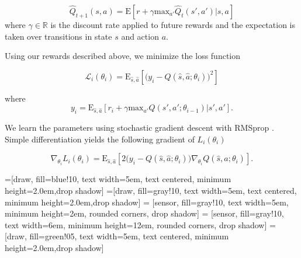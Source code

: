 \documentclass[12pt]{article}
\begin{document}
\begin{equation}
	\hat{Q}_{t+1}(s,a) = \textrm{E}[ r + \gamma \textrm{max}_{a'} \hat{Q}_t(s', a') | s, a]
\end{equation}
where $\gamma \in \mathbb{R}$ is the discount rate applied to future rewards and the expectation is taken over transitions in state $s$ and action $a$.

Using our rewards described above, we minimize the loss function

\begin{equation}
	\mathcal{L}_i(\theta_i) =  \textrm{E}_{\hat{s}, \hat{a}}[ \big (y_i - Q(\hat{s}, \hat{a}; \theta_i) \big )^2]
\end{equation}

where 
\begin{equation}
	y_i = \textrm{E}_{\hat{s}, \hat{a}}[ r_i + \gamma \textrm{max}_{a'} Q(s', a' ; \theta_{i-1}) | s', a' ].
\end{equation}

We learn the parameters using stochastic gradient descent with RMSprop \cite{hinton2012lecture}. Simple differentiation yields the following gradient of $L_i(\theta_i)$

\begin{equation}
	\nabla_{\theta_i} L_i(\theta_i) = \textrm{E}_{\hat{s}, \hat{a}}[ 2  \big (y_i - Q(\hat{s}, \hat{a}; \theta_i) \big ) \nabla_{\theta_{i}}  Q(\hat{s}, \hat{a}; \theta_i)].
\end{equation}


\center
    =[draw, fill=blue!10, text width=5em,  text centered, minimum height=2.0em,drop shadow]
    =[draw, fill=gray!10, text width=5em,  text centered, minimum height=2.0em,drop shadow]
     = [sensor, fill=gray!10, text width=5em,  minimum height=2em, rounded corners, drop shadow]
     = [sensor, fill=gray!10, text width=6em,  minimum height=12em, rounded corners, drop shadow]
     = [draw, fill=green!05, text width=5em,  text centered, minimum height=2.0em,drop shadow]
\end{document}
